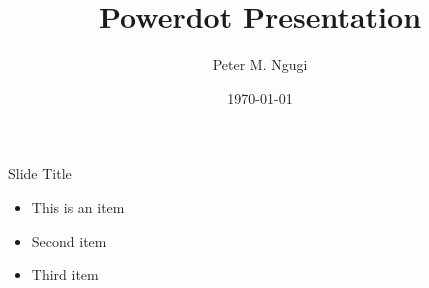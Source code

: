 \documentclass{powerdot}
\title{Powerdot Presentation}
\author{Peter M. Ngugi}
\date{\today}
\begin{document}
	
	\maketitle
	
	\begin{slide}{Slide Title}
		
		\begin{itemize}
			\item This is an item
			\item Second item
			\item Third item
		\end{itemize}
		
	\end{slide}
	
\end{document}
